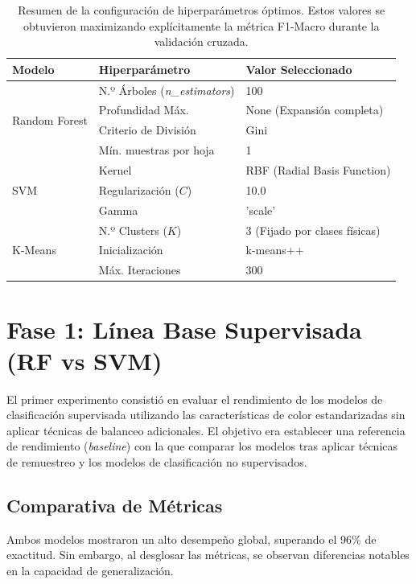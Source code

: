 \documentclass[12pt, a4paper]{report}
\begin{document}
\begin{table}[h!]
\centering
\renewcommand{\arraystretch}{1.3} %
\begin{tabular}{|l|l|p{6cm}|}
\hline
\textbf{Modelo} & \textbf{Hiperparámetro} & \textbf{Valor Seleccionado} \\ \hline
\multirow{4}{*}{Random Forest} 
 & N.º Árboles (\textit{n\_estimators}) & 100 \\ \cline{2-3} 
 & Profundidad Máx. & None (Expansión completa) \\ \cline{2-3} 
 & Criterio de División & Gini \\ \cline{2-3} 
 & Mín. muestras por hoja & 1 \\ \hline
\multirow{3}{*}{SVM} 
 & Kernel & RBF (Radial Basis Function) \\ \cline{2-3} 
 & Regularización ($C$) & 10.0 \\ \cline{2-3} 
 & Gamma & 'scale' \\ \hline
\multirow{3}{*}{K-Means} 
 & N.º Clusters ($K$) & 3 (Fijado por clases físicas) \\ \cline{2-3} 
 & Inicialización & k-means++ \\ \cline{2-3} 
 & Máx. Iteraciones & 300 \\ \hline
\end{tabular}
\caption{Resumen de la configuración de hiperparámetros óptimos. Estos valores se obtuvieron maximizando explícitamente la métrica F1-Macro durante la validación cruzada.}
\label{tab:hiperparametros}
\end{table}

\section{Fase 1: Línea Base Supervisada (RF vs SVM)}

El primer experimento consistió en evaluar el rendimiento de los modelos de clasificación supervisada utilizando las características de color estandarizadas sin aplicar técnicas de balanceo adicionales. El objetivo era establecer una referencia de rendimiento (\textit{baseline}) con la que comparar los modelos tras aplicar técnicas de remuestreo y los modelos de clasificación no supervisados.

\subsection{Comparativa de Métricas}
Ambos modelos mostraron un alto desempeño global, superando el 96\% de exactitud. Sin embargo, al desglosar las métricas, se observan diferencias notables en la capacidad de generalización.
\end{document}
